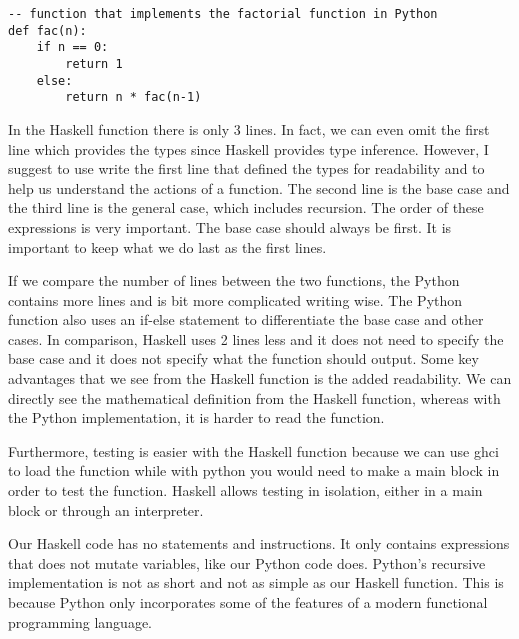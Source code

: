 \documentclass{article}
\begin{document}
\begin{lstlisting}
-- function that implements the factorial function in Python
def fac(n):
    if n == 0:
        return 1
    else:
        return n * fac(n-1)
\end{lstlisting}

In the Haskell function there is only 3 lines. In fact, we can even omit the first line which provides the types since Haskell provides type inference. However, I suggest to use write the first line that defined the types for readability and to help us understand the actions of a function. The second line is the base case and the third line is the general case, which includes recursion. The order of these expressions is very important. The base case should always be first. It is important to keep what we do last as the first lines.

\vspace{\baselineskip}
If we compare the number of lines between the two functions, the Python contains more lines and is bit more complicated writing wise. The Python function also uses an if-else statement to differentiate the base case and other cases. In comparison, Haskell uses 2 lines less and it does not need to specify the base case and it does not specify what the function should output. Some key advantages that we see from the Haskell function is the added readability. We can directly see the mathematical definition from the Haskell function, whereas with the Python implementation, it is harder to read the function. 

\vspace{\baselineskip}
Furthermore, testing is easier with the Haskell function because we can use ghci to load the function while with python you would need to make a main block in order to test the function. Haskell allows testing in isolation, either in a main block or through an interpreter.

\vspace{\baselineskip}
Our Haskell code has no statements and instructions. It only contains expressions that does not mutate variables, like our Python code does. Python’s recursive implementation is not as short and not as simple as our Haskell function. This is because Python only incorporates some of the features of a modern functional programming language.
\end{document}
